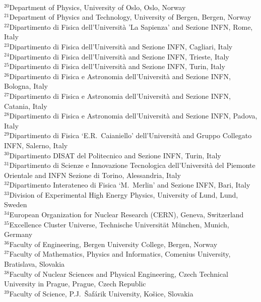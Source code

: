 \begin{flushleft}
\\
$^{20}$Department of Physics, University of Oslo, Oslo, Norway
\\
$^{21}$Department of Physics and Technology, University of Bergen, Bergen, Norway
\\
$^{22}$Dipartimento di Fisica dell'Universit\`{a} 'La Sapienza'
and Sezione INFN, Rome, Italy
\\
$^{23}$Dipartimento di Fisica dell'Universit\`{a}
and Sezione INFN, Cagliari, Italy
\\
$^{24}$Dipartimento di Fisica dell'Universit\`{a}
and Sezione INFN, Trieste, Italy
\\
$^{25}$Dipartimento di Fisica dell'Universit\`{a}
and Sezione INFN, Turin, Italy
\\
$^{26}$Dipartimento di Fisica e Astronomia dell'Universit\`{a}
and Sezione INFN, Bologna, Italy
\\
$^{27}$Dipartimento di Fisica e Astronomia dell'Universit\`{a}
and Sezione INFN, Catania, Italy
\\
$^{28}$Dipartimento di Fisica e Astronomia dell'Universit\`{a}
and Sezione INFN, Padova, Italy
\\
$^{29}$Dipartimento di Fisica `E.R.~Caianiello' dell'Universit\`{a}
and Gruppo Collegato INFN, Salerno, Italy
\\
$^{30}$Dipartimento DISAT del Politecnico and Sezione INFN, Turin, Italy
\\
$^{31}$Dipartimento di Scienze e Innovazione Tecnologica dell'Universit\`{a} del Piemonte Orientale and INFN Sezione di Torino, Alessandria, Italy
\\
$^{32}$Dipartimento Interateneo di Fisica `M.~Merlin'
and Sezione INFN, Bari, Italy
\\
$^{33}$Division of Experimental High Energy Physics, University of Lund, Lund, Sweden
\\
$^{34}$European Organization for Nuclear Research (CERN), Geneva, Switzerland
\\
$^{35}$Excellence Cluster Universe, Technische Universit\"{a}t M\"{u}nchen, Munich, Germany
\\
$^{36}$Faculty of Engineering, Bergen University College, Bergen, Norway
\\
$^{37}$Faculty of Mathematics, Physics and Informatics, Comenius University, Bratislava, Slovakia
\\
$^{38}$Faculty of Nuclear Sciences and Physical Engineering, Czech Technical University in Prague, Prague, Czech Republic
\\
$^{39}$Faculty of Science, P.J.~\v{S}af\'{a}rik University, Ko\v{s}ice, Slovakia

\end{flushleft}
